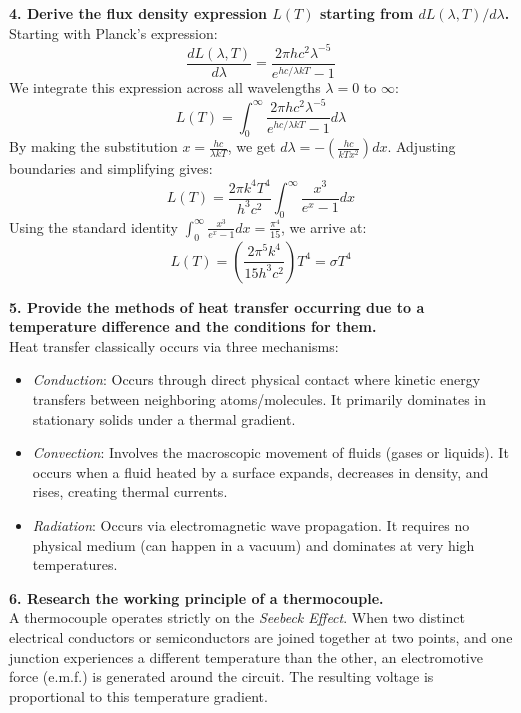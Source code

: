 \documentclass[journal]{IEEEtran}
\begin{document}
\textbf{4. Derive the flux density expression $L(T)$ starting from $dL(\lambda, T)/d\lambda$.} \\
Starting with Planck's expression:
\begin{equation*}
    \frac{dL(\lambda,T)}{d\lambda} = \frac{2\pi h c^2 \lambda^{-5}}{e^{hc/\lambda k T} - 1}
\end{equation*}
We integrate this expression across all wavelengths $\lambda = 0$ to $\infty$:
\begin{equation*}
    L(T) = \int_0^\infty \frac{2\pi h c^2 \lambda^{-5}}{e^{hc/\lambda k T} - 1} d\lambda
\end{equation*}
By making the substitution $x = \frac{hc}{\lambda k T}$, we get $d\lambda = -\left(\frac{hc}{k T x^2}\right) dx$. Adjusting boundaries and simplifying gives:
\begin{equation*}
    L(T) = \frac{2\pi k^4 T^4}{h^3 c^2} \int_0^\infty \frac{x^3}{e^x - 1} dx
\end{equation*}
Using the standard identity $\int_0^\infty \frac{x^3}{e^x - 1} dx = \frac{\pi^4}{15}$, we arrive at:
\begin{equation*}
    L(T) = \left( \frac{2\pi^5 k^4}{15 h^3 c^2} \right) T^4 = \sigma T^4
\end{equation*}

\textbf{5. Provide the methods of heat transfer occurring due to a temperature difference and the conditions for them.} \\
Heat transfer classically occurs via three mechanisms:
\begin{itemize}
    \item \textit{Conduction}: Occurs through direct physical contact where kinetic energy transfers between neighboring atoms/molecules. It primarily dominates in stationary solids under a thermal gradient.
    \item \textit{Convection}: Involves the macroscopic movement of fluids (gases or liquids). It occurs when a fluid heated by a surface expands, decreases in density, and rises, creating thermal currents.
    \item \textit{Radiation}: Occurs via electromagnetic wave propagation. It requires no physical medium (can happen in a vacuum) and dominates at very high temperatures.
\end{itemize}

\textbf{6. Research the working principle of a thermocouple.} \\
A thermocouple operates strictly on the \textit{Seebeck Effect}. When two distinct electrical conductors or semiconductors are joined together at two points, and one junction experiences a different temperature than the other, an electromotive force (e.m.f.) is generated around the circuit. The resulting voltage is proportional to this temperature gradient.
\end{document}

